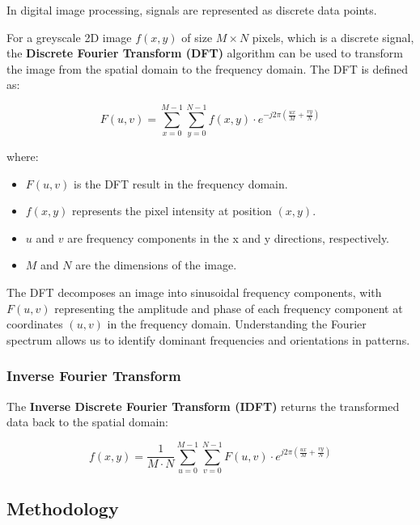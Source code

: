 \documentclass[a4paper,12pt]{article}
\begin{document}
In digital image processing, signals are represented as discrete data points.

For a greyscale 2D image \( f(x, y) \) of size \( M \times N \) pixels, which is a discrete signal, the \textbf{Discrete Fourier Transform (DFT)} algorithm can be used to transform the image from the spatial domain to the frequency domain. The DFT is defined as:

\begin{equation}
    F(u, v) = \sum_{x=0}^{M-1} \sum_{y=0}^{N-1} f(x, y) \cdot e^{-j 2 \pi \left(\frac{ux}{M} + \frac{vy}{N} \right)}
\end{equation}

where:

\begin{itemize}
    \item \( F(u, v) \) is the DFT result in the frequency domain.
    \item \( f(x, y) \) represents the pixel intensity at position \( (x, y) \).
    \item \( u \) and \( v \) are frequency components in the x and y directions, respectively.
    \item \( M \) and \( N \) are the dimensions of the image.
\end{itemize}

The DFT decomposes an image into sinusoidal frequency components, with \( F(u, v) \) representing the amplitude and phase of each frequency component at coordinates \( (u, v) \) in the frequency domain. Understanding the Fourier spectrum allows us to identify dominant frequencies and orientations in patterns.

\subsubsection{Inverse Fourier Transform}

The \textbf{Inverse Discrete Fourier Transform (IDFT)} returns the transformed data back to the spatial domain:

\begin{equation}
    f(x, y) = \frac{1}{M \cdot N} \sum_{u=0}^{M-1} \sum_{v=0}^{N-1} F(u, v) \cdot e^{j 2 \pi \left(\frac{ux}{M} + \frac{vy}{N} \right)}
\end{equation}
    
\subsection{Methodology}
\end{document}

